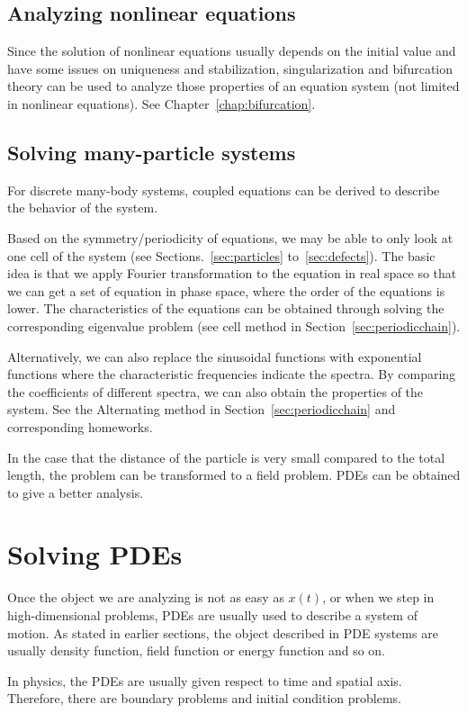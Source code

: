 \subsection{Analyzing nonlinear equations}
Since the solution of nonlinear equations usually depends on the initial value and have some issues on uniqueness and stabilization, singularization and bifurcation theory can be used to analyze those properties of an equation system (not limited in nonlinear equations). See Chapter~\ref{chap:bifurcation}. 

\subsection{Solving many-particle systems}
For discrete many-body systems, coupled equations can be derived to describe the behavior of the system. 

Based on the symmetry/periodicity of equations, we may be able to only look at one cell of the system (see Sections.~\ref{sec:particles} to~\ref{sec:defects}). The basic idea is that we apply Fourier transformation to the equation in real space so that we can get a set of equation in phase space, where the order of the equations is lower. The characteristics of the equations can be obtained through solving the corresponding eigenvalue problem (see cell method in Section~\ref{sec:periodicchain}). 

Alternatively, we can also replace the sinusoidal functions with exponential functions where the characteristic frequencies indicate the spectra. By comparing the coefficients of different spectra, we can also obtain the properties of the system. See the Alternating method in Section~\ref{sec:periodicchain} and corresponding homeworks. 

In the case that the distance of the particle is very small compared to the total length, the problem can be transformed to a field problem. PDEs can be obtained to give a better analysis. 

\section{Solving PDEs}
Once the object we are analyzing is not as easy as $ x(t) $, or when we step in high-dimensional problems, PDEs are usually used to describe a system of motion. As stated in earlier sections, the object described in PDE systems are usually density function, field function or energy function and so on. 

In physics, the PDEs are usually given respect to time and spatial axis. Therefore, there are boundary problems and initial condition problems. 

